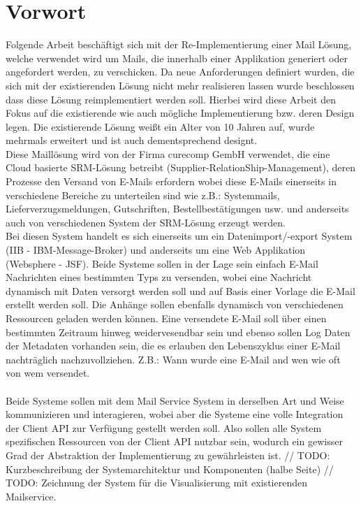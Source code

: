 \chapter{Vorwort} 	%
Folgende Arbeit beschäftigt sich mit der Re-Implementierung einer Mail Lösung, welche verwendet wird um Mails, die innerhalb einer Applikation generiert oder angefordert werden, zu verschicken. 
Da neue Anforderungen definiert wurden, die sich mit der existierenden Lösung nicht mehr realisieren lassen wurde beschlossen dass diese Lösung reimplementiert werden soll. Hierbei wird diese Arbeit den Fokus auf die existierende wie auch mögliche Implementierung bzw. deren Design legen. 
Die existierende Lösung weißt ein Alter von 10 Jahren auf, wurde mehrmals erweitert und ist auch dementsprechend designt. \\

Diese Maillösung wird von der Firma curecomp GembH verwendet, die eine Cloud basierte SRM-Lösung betreibt (Supplier-RelationShip-Management), deren Prozesse den Versand von E-Mails erfordern wobei diese E-Mails einerseits in verschiedene Bereiche zu unterteilen sind wie z.B.: Systemmails, Lieferverzugsmeldungen, Gutschriften, Bestellbestätigungen usw. und anderseits auch von verschiedenen System der SRM-Lösung erzeugt werden. \\
Bei diesen System handelt es sich einerseits um ein Datenimport/-export System (IIB - IBM-Message-Broker) und anderseits um eine Web Applikation (Websphere - JSF). Beide Systeme sollen in der Lage sein einfach E-Mail Nachrichten eines bestimmten Typs zu versenden, wobei eine Nachricht dynamisch mit Daten versorgt werden soll und auf Basis einer Vorlage die E-Mail erstellt werden soll. Die Anhänge sollen ebenfalls dynamisch von verschiedenen Ressourcen geladen werden können. Eine versendete E-Mail soll über einen bestimmten Zeitraum hinweg weidervesendbar sein und ebenso sollen Log Daten der Metadaten vorhanden sein, die es erlauben den Lebenszyklus einer E-Mail nachträglich nachzuvollziehen. Z.B.: Wann wurde eine E-Mail and wen wie oft von wem versendet. \\\\
Beide Systeme sollen mit dem Mail Service System in derselben Art und Weise kommunizieren und interagieren, wobei aber die Systeme eine volle Integration der Client API zur Verfügung gestellt werden soll. Also sollen alle System spezifischen Ressourcen von der Client API nutzbar sein, wodurch ein gewisser Grad der Abstraktion der Implementierung zu gewährleisten ist.
\newpage
// TODO: Kurzbeschreibung der Systemarchitektur und Komponenten (halbe Seite)
// TODO: Zeichnung der System für die Visualisierung mit existierenden Mailservice.
